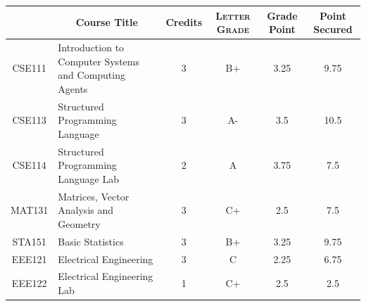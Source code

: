 \documentclass[11pt]{article}
\newcommand*{\numtwo}[1]{\pgfmathprintnumber[
                    fixed, precision=2, fixed zerofill=true]{#1}}
\begin{document}
                \begin{center}
                    \renewcommand{\arraystretch}{1.08}
                    
                \begin{tabular}{|c|l|c|>{\scshape}c|c|c|}
                \hline  \rule[-1ex]{0pt}{3.5ex} {\centering{\bf Course Code}} &  \multicolumn{1}{c|}{\textbf{Course Title}}  & {\bf Credits} & {\bf Letter Grade} & {\bf Grade Point} & {\bf Point Secured}  \\ 
                \hline   CSE111 &  Introduction to Computer Systems and Computing Agents		 & 3 & B+ & 3.25 & 9.75 \\ %
                \hline   CSE113 &  Structured Programming Language		 & 3 & A- & 3.5 & 10.5 \\ %
                \hline   CSE114 &  Structured Programming Language Lab		 & 2 & A & 3.75 & 7.5 \\ %
                \hline   MAT131 &  Matrices, Vector Analysis and Geometry		 & 3 & C+ & 2.5 & 7.5 \\ %
                \hline   STA151 &  Basic Statistics		 & 3 & B+ & 3.25 & 9.75 \\ %
                \hline   EEE121 &  Electrical Engineering		 & 3 & C & 2.25 & 6.75 \\ %
                \hline   EEE122 &  Electrical Engineering Lab		 & 1 & C+ & 2.5 & 2.5 \\ %

\hline                %
                \end{tabular}
                \end{center}
                \renewcommand{\arraystretch}{1.03}
\end{document}
